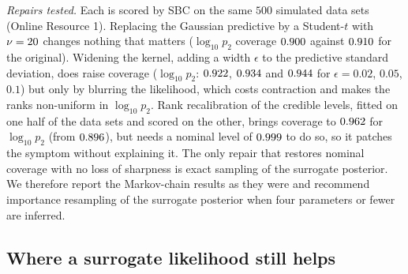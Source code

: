 \documentclass[sn-basic,iicol,pdflatex]{sn-jnl}
\begin{document}
\emph{Repairs tested.} Each is scored by SBC on the same $500$ simulated data sets (Online Resource 1). Replacing the Gaussian predictive by a Student-$t$ with $\nu=20$ changes nothing that matters
($\log_{10}p_2$ coverage $0.900$ against $0.910$ for the original). Widening the kernel, adding a width $\epsilon$ to the predictive standard deviation, does raise coverage
($\log_{10}p_2$: $0.922$, $0.934$ and $0.944$ for $\epsilon=0.02$, $0.05$, $0.1$) but only by blurring the likelihood, which costs contraction and makes
the ranks non-uniform in $\log_{10}p_2$. Rank recalibration of the credible levels, fitted on one half of the data sets and scored on the other, brings coverage to $0.962$ for $\log_{10}p_2$
(from $0.896$), but needs a nominal level of $0.999$ to do so, so it patches the symptom without explaining it. The only repair that restores nominal coverage with no loss of
sharpness is exact sampling of the surrogate posterior. We therefore report the Markov-chain results as they were and recommend importance resampling of the surrogate posterior when four parameters or fewer are inferred.

\subsection{Where a surrogate likelihood still helps}
\label{sec:edge}
\end{document}
